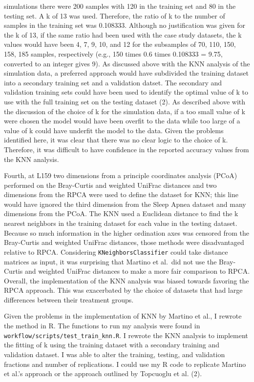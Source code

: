 \documentclass[
]{article}
\begin{document}
simulations there were 200 samples with 120 in the training set and 80
in the testing set. A k of 13 was used. Therefore, the ratio of k to the
number of samples in the training set was 0.108333. Although no
justification was given for the k of 13, if the same ratio had been used
with the case study datasets, the k values would have been 4, 7, 9, 10,
and 12 for the subsamples of 70, 110, 150, 158, 185 samples,
respectively (e.g., 150 times 0.6 times 0.108333 = 9.75, converted to an
integer gives 9). As discussed above with the KNN analysis of the
simulation data, a preferred approach would have subdivided the training
dataset into a secondary training set and a validation datset. The
secondary and validation training sets could have been used to identify
the optimal value of k to use with the full training set on the testing
dataset (2). As described above with the discussion of the choice of k
for the simulation data, if a too small value of k were chosen the model
would have been overfit to the data while too large of a value of k
could have underfit the model to the data. Given the problems identified
here, it was clear that there was no clear logic to the choice of k.
Therefore, it was difficult to have confidence in the reported accuracy
values from the KNN analysis.

Fourth, at L159 two dimensions from a principle coordinates analysis
(PCoA) performed on the Bray-Curtis and weighted UniFrac distances and
two dimensions from the RPCA were used to define the dataset for KNN;
this line would have ignored the third dimension from the Sleep Apnea
dataset and many dimensions from the PCoA. The KNN used a Euclidean
distance to find the k nearest neighbors in the training dataset for
each value in the testing dataset. Because so much information in the
higher ordination axes was censored from the Bray-Curtis and weighted
UniFrac distances, those methods were disadvantaged relative to RPCA.
Considering \texttt{KNeighborsClassifier} could take distance matrices
as input, it was surprising that Martino et al.~did not use the
Bray-Curtis and weighted UniFrac distances to make a more fair
comparison to RPCA. Overall, the implementation of the KNN analysis was
biased towards favoring the RPCA approach. This was exacerbated by the
choice of datasets that had large differences between their treatment
groups.

Given the problems in the implementation of KNN by Martino et al., I
rewrote the method in R. The functions to run my analysis were found in
\texttt{workflow/scripts/test\_train\_knn.R}. I rewrote the KNN analysis
to implement the fitting of k using the training dataset with a
secondary training and validation dataset. I was able to alter the
training, testing, and validation fractions and number of replications.
I could use my R code to replicate Martino et al.'s approach or the
approach outlined by Topcuoglu et al. (2).
\end{document}
